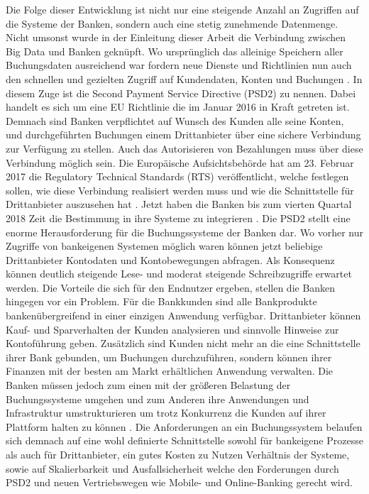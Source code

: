 \documentclass[12pt,oneside,a4paper,parskip]{scrbook}
\begin{document}
Die Folge dieser Entwicklung ist nicht nur eine steigende Anzahl an Zugriffen auf die Systeme der Banken, sondern auch eine stetig zunehmende Datenmenge. Nicht umsonst wurde in der Einleitung dieser Arbeit die Verbindung zwischen Big Data und Banken geknüpft. Wo ursprünglich das alleinige Speichern aller Buchungsdaten ausreichend war fordern neue Dienste und Richtlinien nun auch den schnellen und gezielten Zugriff auf Kundendaten, Konten und Buchungen \cite{bigdataBigStorage}. In diesem Zuge ist die Second Payment Service Directive (PSD2) zu nennen. Dabei handelt es sich um eine EU Richtlinie die im Januar 2016 in Kraft getreten ist. Demnach sind Banken verpflichtet auf Wunsch des Kunden alle seine Konten, und durchgeführten Buchungen einem Drittanbieter über eine sichere Verbindung zur Verfügung zu stellen. Auch das Autorisieren von Bezahlungen muss über diese Verbindung möglich sein. Die Europäische Aufsichtsbehörde hat am 23. Februar 2017 die Regulatory Technical Standards (RTS) veröffentlicht, welche festlegen sollen, wie diese Verbindung realisiert werden muss und wie die Schnittstelle für Drittanbieter auszusehen hat \cite{rts}. Jetzt haben die Banken bis zum vierten Quartal 2018 Zeit die Bestimmung in ihre Systeme zu integrieren \cite{eu-psd2}\cite{psd2dk}. Die PSD2 stellt eine enorme Herausforderung für die Buchungssysteme der Banken dar. Wo vorher nur Zugriffe von bankeigenen Systemen möglich waren können jetzt beliebige Drittanbieter Kontodaten und Kontobewegungen abfragen. Als Konsequenz können deutlich steigende Lese- und moderat steigende Schreibzugriffe erwartet werden. Die Vorteile die sich für den Endnutzer ergeben, stellen die Banken hingegen vor ein Problem. Für die Bankkunden sind alle Bankprodukte bankenübergreifend in einer einzigen Anwendung verfügbar. Drittanbieter können Kauf- und Sparverhalten der Kunden analysieren und sinnvolle Hinweise zur Kontoführung geben. Zusätzlich sind Kunden nicht mehr an die eine Schnittstelle ihrer Bank gebunden, um Buchungen durchzuführen, sondern können ihrer Finanzen mit der besten am Markt erhältlichen Anwendung verwalten. Die Banken müssen jedoch zum einen mit der größeren Belastung der Buchungssysteme umgehen und zum Anderen ihre Anwendungen und Infrastruktur umstrukturieren um trotz Konkurrenz die Kunden auf ihrer Plattform halten zu können \cite{psd2vid}.
Die Anforderungen an ein Buchungssystem belaufen sich demnach auf eine wohl definierte Schnittstelle sowohl für bankeigene Prozesse als auch für Drittanbieter, ein gutes Kosten zu Nutzen Verhältnis der Systeme, sowie auf Skalierbarkeit und Ausfallsicherheit welche den Forderungen durch PSD2 und neuen Vertriebswegen wie Mobile- und Online-Banking gerecht wird.
\end{document}
